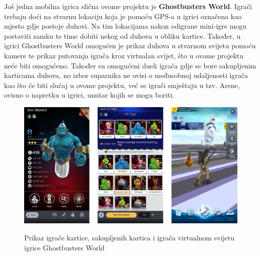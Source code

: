 		\textnormal{Još jedna mobilna igrica slična ovome projektu je \textbf{Ghostbusters World}. Igrači trebaju doći na stvarnu lokaciju koja je pomoću GPS-a u igrici označena kao mjesto gdje postoje duhovi. Na tim lokacijama nakon odigrane mini-igre mogu postaviti zamku te time dobiti nekog od duhova u obliku kartice. Također, u igrici Ghostbusters World omogućen je prikaz duhova u stvarnom svijetu pomoću kamere te prikaz putovanja igrača kroz virtualan svijet, što u ovome projektu neće biti omogućeno. Također su omogućeni dueli igrača gdje se bore sakupljenim karticama duhova, no izbor suparnika ne ovisi o međusobnoj udaljenosti igrača kao što će biti slučaj u ovome projektu, već se igrači smještaju u tzv. Arene, ovisno o napretku u igrici, unutar kojih se mogu boriti.}
		
		\begin{figure}[H]
			\centering
			\includegraphics[scale=0.6]{slike/Ghostbusters} \\%
			\caption{Prikaz igrače kartice, sakupljenih kartica i igrača virtualnom svijetu igrice Ghostbusters World}
			\label{fig:Ghostbusters} %
		\end{figure}	
		
		\eject
		
		